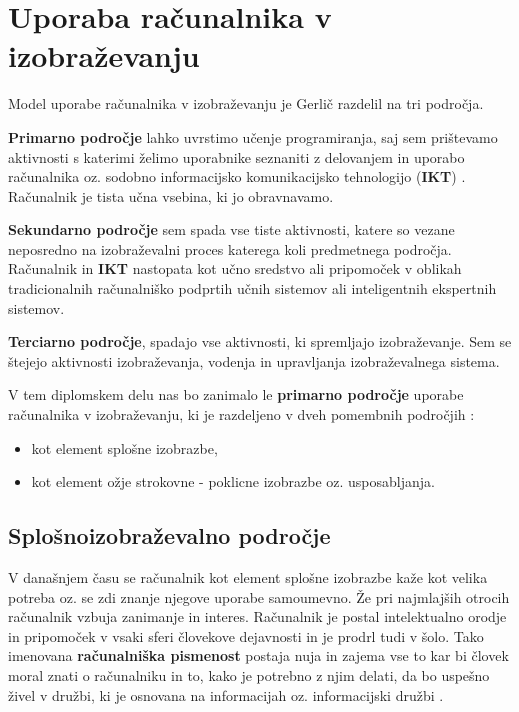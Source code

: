 
\section{Uporaba računalnika v izobraževanju}
\label{sec:uporaba-raunalnika-v}

Model uporabe računalnika v izobraževanju je Gerlič \cite{gerlic_2000}
razdelil na tri področja.

\textbf{Primarno področje} lahko uvrstimo učenje programiranja, saj
sem prištevamo aktivnosti s katerimi želimo uporabnike seznaniti z
delovanjem in uporabo računalnika oz. sodobno informacijsko
komunikacijsko tehnologijo (\textbf{IKT})
\cite{model_uporabe_rac_izo-web}. Računalnik je tista učna vsebina, ki
jo obravnavamo.

\textbf{Sekundarno področje} sem spada vse tiste aktivnosti, katere so
vezane neposredno na izobraževalni proces katerega koli predmetnega
področja. Računalnik in \textbf{IKT} nastopata kot učno sredstvo ali
pripomoček v oblikah tradicionalnih računalniško podprtih učnih
sistemov ali inteligentnih ekspertnih sistemov.

\textbf{Terciarno področje}, spadajo vse aktivnosti, ki spremljajo
izobraževanje. Sem se štejejo aktivnosti izobraževanja, vodenja  in
upravljanja izobraževalnega sistema.

V tem diplomskem delu nas bo zanimalo le \textbf{primarno področje}
uporabe računalnika v izobraževanju, ki je razdeljeno v dveh pomembnih
področjih \cite{gerlic_2000}:

\begin{itemize}
\item kot element splošne izobrazbe,
\item kot element ožje strokovne - poklicne izobrazbe
  oz. usposabljanja.
\end{itemize}

\subsection{Splošnoizobraževalno področje}
\label{sec:spološnoiz_področje}

V današnjem času se računalnik kot element splošne izobrazbe kaže kot
velika potreba oz. se zdi znanje njegove uporabe samoumevno. Že pri
najmlajših otrocih računalnik vzbuja zanimanje in interes.  Računalnik
je postal intelektualno orodje in pripomoček v vsaki sferi človekove
dejavnosti in je prodrl tudi v šolo. Tako imenovana \textbf{računalniška
  pismenost} postaja nuja in zajema vse to kar bi človek moral znati o
računalniku in to, kako je potrebno z njim delati, da bo uspešno živel
v družbi, ki je osnovana na informacijah oz. informacijski družbi
\cite{klemencic_2011}.

